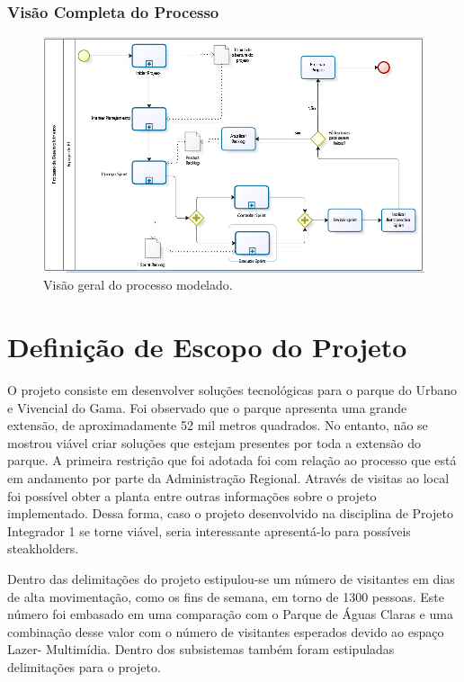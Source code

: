 \subsubsection{Visão Completa do Processo}

\begin{figure}[H]
	\centering
	\label{Visão geral do processo modelado}
		\includegraphics[keepaspectratio=true,scale=0.9,angle=270]{processo/ProcessoCompleto.png}
	\caption{Visão geral do processo modelado.}
\end{figure}

\section{Definição de Escopo do Projeto}

	O projeto consiste em desenvolver soluções tecnológicas para o parque do Urbano e Vivencial do Gama. Foi observado que o parque apresenta uma grande extensão, de aproximadamente 52 mil metros quadrados. No entanto, não se mostrou viável criar soluções que estejam presentes por toda a extensão do parque. A primeira restrição que foi adotada foi com relação ao processo que está em andamento por parte da Administração Regional. Através de visitas ao local foi possível obter a planta entre outras informações sobre o projeto implementado. Dessa forma, caso o projeto desenvolvido na disciplina de Projeto Integrador 1 se torne viável, seria interessante apresentá-lo para possíveis steakholders. 

	Dentro das delimitações do projeto estipulou-se um número de visitantes em dias de alta movimentação, como os fins de semana, em torno de 1300 pessoas. Este número foi embasado em uma comparação com o Parque de Águas Claras e uma combinação desse valor com o número de visitantes esperados devido ao espaço Lazer- Multimídia. 
Dentro dos subsistemas também foram estipuladas delimitações para o projeto. 
	
